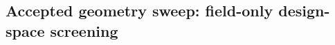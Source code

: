 %
%
\subsection{Accepted geometry sweep: field-only design-space screening}
\label{sec:l1a-sweep-v2}

